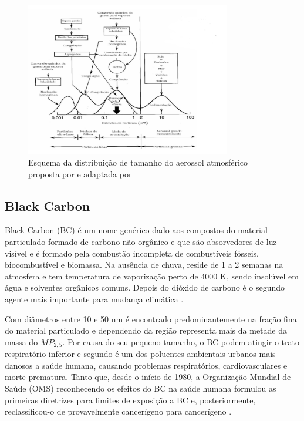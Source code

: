 \begin{figure}[H]
  \centering
  \includegraphics[width=0.8\textwidth]{../inputs/images/modas_aerossol.png}
  \caption{Esquema da distribuição de tamanho do aerossol atmosférico proposta
           por \citet{finlayson1999} e adaptada por \citet{oliveira2007} 
           \label{fig:modas_aerossol}}
\end{figure}

\subsection{Black Carbon}

Black Carbon (BC) é um nome genérico dado aos compostos do material particulado 
formado de carbono não orgânico e que são absorvedores de luz visível e é 
formado pela combustão incompleta de combustíveis fósseis, biocombustível e 
biomassa. Na ausência de chuva, reside de 1 a 2 semanas na atmosfera e tem 
temperatura de vaporização perto de 4000 K, sendo insolúvel em água e solventes 
orgânicos comuns. Depois do dióxido de carbono é o segundo agente mais 
importante para mudança climática \citep{bond2013}.

Com diâmetros entre 10 e 50 nm é encontrado predominantemente na fração fina do 
material particulado e dependendo da região representa mais da metade 
da massa do $MP_{2,5}$. Por causa do seu pequeno tamanho, o BC podem atingir o 
trato respiratório inferior e segundo \citet{jacobson2014} é um dos poluentes
ambientais urbanos mais danosos a saúde humana, causando problemas 
respiratórios, cardiovasculares e morte prematura. Tanto que, desde o início 
de 1980, a Organização Mundial de Saúde (OMS) reconhecendo os efeitos do BC na 
saúde humana formulou as primeiras diretrizes para limites de exposição a BC e, 
posteriormente, reclassificou-o de provavelmente cancerígeno para cancerígeno 
\citep{scovronick2015}. 

